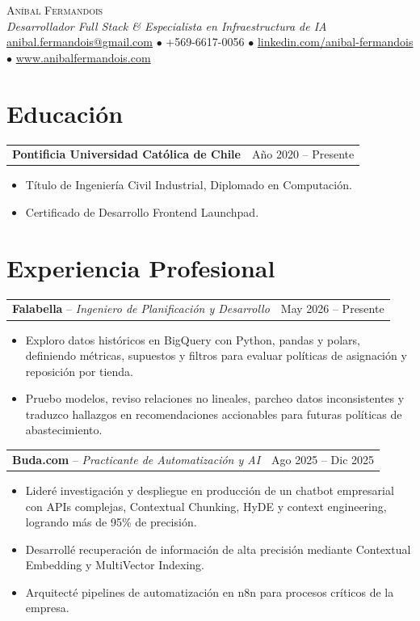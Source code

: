 \documentclass[10pt,letterpaper]{article}
\makeatletter
\newcommand{\position}[4]{%
  \begin{tabularx}{\linewidth}{@{}Xr@{}}
    \textbf{#1} -- \textit{#2} & {\color{muted}#3} \\
  \end{tabularx}
  #4
}
\makeatother
\begin{document}
\begin{center}
  {\fontsize{24}{24}\selectfont\scshape Aníbal Fermandois}\\
  \vspace{3pt}
  \textit{Desarrollador Full Stack \& Especialista en Infraestructura de IA}\\
  \vspace{4pt}
  \href{mailto:anibal.fermandois@gmail.com}{anibal.fermandois@gmail.com}
  \quad $\bullet$ \quad +569-6617-0056
  \quad $\bullet$ \quad \href{https://www.linkedin.com/in/anibal-fermandois-224ab4262/}{linkedin.com/anibal-fermandois}
  \quad $\bullet$ \quad \href{https://www.anibalfermandois.com/}{www.anibalfermandois.com}
\end{center}

\section{Educación}
\begin{tabularx}{\linewidth}{@{}Xr@{}}
\textbf{Pontificia Universidad Católica de Chile} & Año 2020 -- Presente \\
\end{tabularx}
\begin{itemize}
  \item Título de Ingeniería Civil Industrial, Diplomado en Computación.
  \item Certificado de Desarrollo Frontend Launchpad.
\end{itemize}

\section{Experiencia Profesional}
\position{Falabella}{Ingeniero de Planificación y Desarrollo}{May 2026 -- Presente}{
\begin{itemize}
  \item Exploro datos históricos en BigQuery con Python, pandas y polars, definiendo métricas, supuestos y filtros para evaluar políticas de asignación y reposición por tienda.
  \item Pruebo modelos, reviso relaciones no lineales, parcheo datos inconsistentes y traduzco hallazgos en recomendaciones accionables para futuras políticas de abastecimiento.
\end{itemize}}

\position{Buda.com}{Practicante de Automatización y AI}{Ago 2025 -- Dic 2025}{
\begin{itemize}
  \item Lideré investigación y despliegue en producción de un chatbot empresarial con APIs complejas, Contextual Chunking, HyDE y context engineering, logrando más de 95\% de precisión.
  \item Desarrollé recuperación de información de alta precisión mediante Contextual Embedding y MultiVector Indexing.
  \item Arquitecté pipelines de automatización en n8n para procesos críticos de la empresa.
\end{itemize}}
\end{document}
